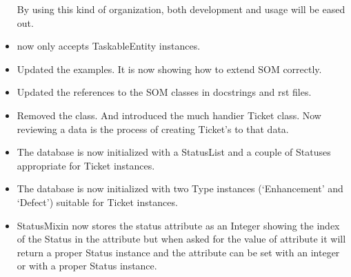 \documentclass[a4paper,10pt,english]{sphinxmanual}
\begin{document}
\begin{itemize}
By using this kind of organization, both development and usage will be eased
out.

\item {} 
 now only accepts TaskableEntity instances.

\item {} 
Updated the examples. It is now showing how to extend SOM correctly.

\item {} 
Updated the references to the SOM classes in docstrings and rst files.

\item {} 
Removed the  class. And introduced the much handier Ticket class.
Now reviewing a data is the process of creating Ticket's to that data.

\item {} 
The database is now initialized with a StatusList and a couple of Statuses
appropriate for Ticket instances.

\item {} 
The database is now initialized with two Type instances (`Enhancement' and
`Defect') suitable for Ticket instances.

\item {} 
StatusMixin now stores the status attribute as an Integer showing the index
of the Status in the  attribute but when asked for the value
of  attribute it will return a proper Status instance
and the attribute can be set with an integer or with a proper Status
instance.

\end{itemize}
\end{document}

